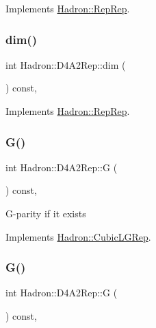 Implements \mbox{\hyperlink{structHadron_1_1RepRep_a92c8802e5ed7afd7da43ccfd5b7cd92b}{Hadron\+::\+Rep\+Rep}}.

\mbox{\label{structHadron_1_1D4A2Rep_adc6df0a40f7af491e096e53145f91543}} 
\subsubsection{\texorpdfstring{dim()}{dim()}\hspace{0.1cm}{\footnotesize\ttfamily [3/3]}}
{\footnotesize\ttfamily int Hadron\+::\+D4\+A2\+Rep\+::dim (\begin{DoxyParamCaption}{ }\end{DoxyParamCaption}) const\hspace{0.3cm}{\ttfamily [inline]}, {\ttfamily [virtual]}}



Implements \mbox{\hyperlink{structHadron_1_1RepRep_a92c8802e5ed7afd7da43ccfd5b7cd92b}{Hadron\+::\+Rep\+Rep}}.

\mbox{\label{structHadron_1_1D4A2Rep_aae5eadd2c620fdaa4919f64e4b8cec2d}} 
\subsubsection{\texorpdfstring{G()}{G()}\hspace{0.1cm}{\footnotesize\ttfamily [1/2]}}
{\footnotesize\ttfamily int Hadron\+::\+D4\+A2\+Rep\+::G (\begin{DoxyParamCaption}{ }\end{DoxyParamCaption}) const\hspace{0.3cm}{\ttfamily [inline]}, {\ttfamily [virtual]}}

G-\/parity if it exists 

Implements \mbox{\hyperlink{structHadron_1_1CubicLGRep_ace26f7b2d55e3a668a14cb9026da5231}{Hadron\+::\+Cubic\+L\+G\+Rep}}.

\mbox{\label{structHadron_1_1D4A2Rep_aae5eadd2c620fdaa4919f64e4b8cec2d}} 
\subsubsection{\texorpdfstring{G()}{G()}\hspace{0.1cm}{\footnotesize\ttfamily [2/2]}}
{\footnotesize\ttfamily int Hadron\+::\+D4\+A2\+Rep\+::G (\begin{DoxyParamCaption}{ }\end{DoxyParamCaption}) const\hspace{0.3cm}{\ttfamily [inline]}, {\ttfamily [virtual]}}


